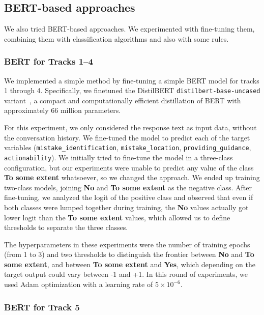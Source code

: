 \documentclass[11pt]{article}
\begin{document}
\subsection{BERT-based approaches}

We also tried BERT-based approaches.
We experimented with fine-tuning them, combining them with classification algorithms and also with some rules. 

\subsubsection{BERT for Tracks 1--4}

We implemented a simple method by fine-tuning a simple BERT model for tracks 1 through 4. 
Specifically, we finetuned the DistilBERT \texttt{distilbert-base-uncased} variant~\cite{sanh2020distilbert}, a compact and computationally efficient distillation of BERT with approximately 66 million parameters.

For this experiment, we only considered the response text as input data, without the conversation history. We fine-tuned the model to predict each of the target variables (\texttt{mistake\_identification}, \texttt{mistake\_location}, \texttt{providing\_guidance}, \texttt{actionability}).
We initially tried to fine-tune the model in a three-class configuration, but our experiments were unable to predict any value of the class \textbf{To some extent} whatsoever, so we changed the approach.
We ended up training two-class models, joining \textbf{No} and \textbf{To some extent} as the negative class.
After fine-tuning, we analyzed the logit of the positive class and observed that even if both classes were lumped together during training, the \textbf{No} values actually got lower logit than the \textbf{To some extent} values, which allowed us to define thresholds to separate the three classes.

The hyperparameters in these experiments were the number of training epochs (from 1 to 3) and two thresholds to distinguish the frontier between \textbf{No} and \textbf{To some extent}, and between \textbf{To some extent} and \textbf{Yes}, which depending on the target output could vary between -1 and +1. In this round of experiments, we used Adam optimization with a learning rate of $5 \times 10^{-6}$.

\subsubsection{BERT for Track 5}
\end{document}
